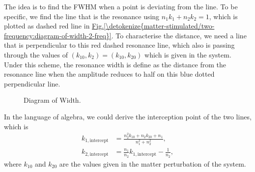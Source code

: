 \documentclass[letterpaper,12pt,english]{sphinxmanual}
\begin{document}
The idea is to find the FWHM when a point is deviating from the line. To be specific, we find the line that is the resonance using \(n_1 k_1 + n_2 k_2 = 1\), which is plotted as dashed red line in \hyperref[\detokenize{matter-stimulated/two-frequency:diagram-of-width-2-freq}]{Fig.\@ \ref{\detokenize{matter-stimulated/two-frequency:diagram-of-width-2-freq}}}. To characterise the distance, we need a line that is perpendicular to this red dashed resonance line, which also is passing through the values of \((k_10,k_2)=(k_{10},k_{20})\) which is given in the system. Under this scheme, the resonance width is define as the distance from the resonance line when the amplitude reduces to half on this blue dotted perpendicular line.
\begin{figure}[htbp]
\centering
\capstart

\noindent{}
\caption{Diagram of Width.}\label{\detokenize{matter-stimulated/two-frequency:diagram-of-width-2-freq}}\label{\detokenize{matter-stimulated/two-frequency:id4}}\end{figure}

In the language of algebra, we could derive the interception point of the two lines, which is
\begin{equation*}
\begin{split}k_{1,\mathrm{intercept}} &= \frac{n_2^2 k_{10} + n_2 k_{20} + n_1 }{n_1^2 + n_2^2}, \\
k_{2,\mathrm{intercept}} &= \frac{n_1}{n_2}k_{1,\mathrm{intercept}} - \frac{1}{n_2},\end{split}
\end{equation*}
where \(k_{10}\) and \(k_{20}\) are the values given in the matter perturbation of the system.
\end{document}
